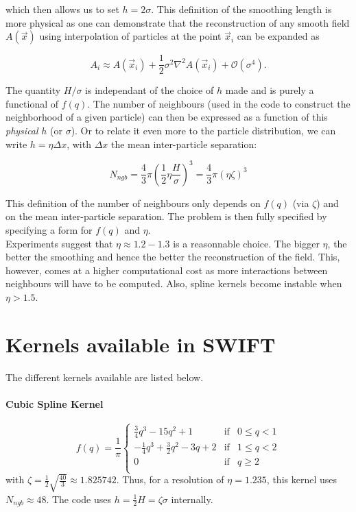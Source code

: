 \documentclass[a4paper,10pt]{article}
\begin{document}
which then allows us to set $h=2\sigma$. This definition of the smoothing length is more physical as one can 
demonstrate that the reconstruction of any smooth field $A(\vec{x})$ using interpolation of particles at the point 
$\vec{x}_i$ can be expanded as

\begin{equation}
A_i  \approx A(\vec{x}_i) + \frac{1}{2}\sigma^2 \nabla^2A(\vec{x}_i) + \mathcal{O}\left(\sigma^4\right).
\end{equation}

The quantity $H/\sigma$ is independant of the choice of $h$ made and is purely a functional of $f(q)$. The number of 
neighbours (used in the code to construct the neighborhood of a given particle) can then be expressed as a function of 
this \emph{physical} $h$ (or $\sigma$). Or to relate it even more to the particle distribution, we can write 
$h=\eta\Delta x$, with $\Delta x$ the mean inter-particle separation:

\begin{equation}
 N_{ngb} = \frac{4}{3}\pi \left(\frac{1}{2}\eta\frac{H}{\sigma}\right)^3 = \frac{4}{3}\pi 
\left(\eta\zeta\right)^3
\end{equation}

This definition of the number of neighbours only depends on $f(q)$ (via $\zeta$) and on the mean inter-particle 
separation. The problem is then fully specified by specifying a form for $f(q)$ and $\eta$. \\
Experiments suggest that $\eta \approx 1.2 - 1.3$ is a reasonnable choice. The bigger $\eta$, the better the smoothing 
and hence the better the reconstruction of the field. This, however, comes at a higher computational cost as more 
interactions between neighbours will have to be computed. Also, spline kernels become instable when $\eta>1.5$. 

\section{Kernels available in SWIFT}

The different kernels available are listed below.
\paragraph{Cubic Spline Kernel}
\begin{equation*}
 f(q) = \frac{1}{\pi}\left\lbrace \begin{array}{rcl}
                      \frac{3}{4}q^3 - 15q^2 + 1 & \mbox{if} & 0 \leq q < 1 \\
		      -\frac{1}{4}q^3 + \frac{3}{2}q^2-3q+2 & \mbox{if} & 1 \leq q < 2 \\
		      0 & \mbox{if} & q \geq 2 \\
                     \end{array}\right.
\end{equation*}
with $\zeta = \frac{1}{2}\sqrt{\frac{40}{3}} \approx 1.825742$. Thus, for a resolution of $\eta = 1.235$, this kernel 
uses $N_{ngb} \approx 48$. The code uses $h = \frac{1}{2}H = \zeta \sigma$ internally.
\end{document}
